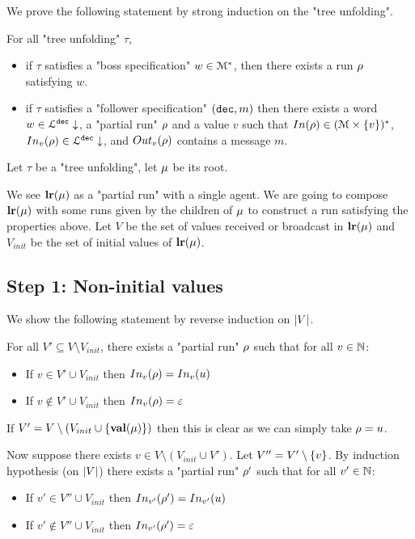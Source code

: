 \LemTreeToRun*


	We prove the following statement by strong induction on the "tree unfolding". 
	
	For all "tree unfolding" $\tau$, 
	
	\begin{itemize}
		\item if $\tau$ satisfies a "boss specification" $w \in \mathcal{M}^*$, then there exists a run $\rho$ satisfying $w$.
		
		\item if $\tau$ satisfies a "follower specification" $(\mathtt{dec}, m)$ then there exists a word $w \in \mathcal{L}^{\mathtt{\mathtt{dec}}}\downarrow$, a "partial run" $\rho$ and a value $v$ such that $\Input{\run} \in (\messages\times \set{v})^*$, $\vinput{v}{\run} \in \langdecdown{\decsymb}$, and $\voutput{v}{\run}$ contains a message $m$.
	\end{itemize}
	
	Let $\tau$ be a "tree unfolding", let $\mu$ be its root.
	
	We see $\mathbf{lr}(\mu)$ as a "partial run" with a single agent.
	We are going to compose $\mathbf{lr}(\mu)$ with some runs given by the children of $\mu$ to construct a run satisfying the properties above.
	Let $V$ be the set of values received or broadcast in $\mathbf{lr}(\mu)$ and $V_{init}$ be the set of initial values of $\mathbf{lr}(\mu)$.
	
	
	\subsection{Step 1: Non-initial values}
	
	We show the following statement by reverse induction on $|V|$.
	
	For all $V' \subseteq V\setminus V_{init}$, there exists a "partial run" $\rho$ such that for all $v \in \mathbb{N}$:
	\begin{itemize}
		\item If $v \in V' \cup V_{init}$ then $\vinput{v}{\run} = \vinput{v}{u}$
		
		\item If $v \notin V' \cup V_{init}$ then $\vinput{v}{\run} = \epsilon$
	\end{itemize}  
	
	If $V' = V\setminus (V_{init} \cup \{\mathbf{val}(\mu)\})$ then this is clear as we can simply take $\rho = u$.
	
	Now suppose there exists $v \in V \setminus (V_{init} \cup V')$. Let $V'' = V' \setminus \{v\}$. By induction hypothesis (on $|V|$) there exists a "partial run" $\rho'$ such that for all $v' \in \mathbb{N}$:
	\begin{itemize}
		\item If $v' \in V'' \cup V_{init}$ then $\vinput{v'}{\run'} = \vinput{v'}{u}$
		
		\item If $v' \notin V'' \cup V_{init}$ then $\vinput{v'}{\run'} = \varepsilon$
	\end{itemize}

